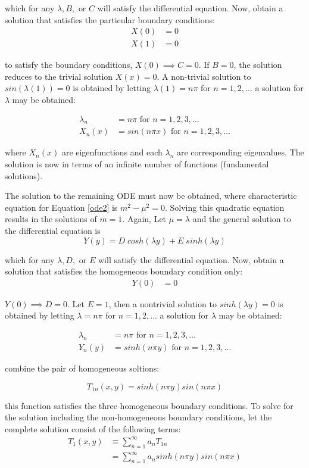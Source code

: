 \documentclass[letterpaper, 10pt, oneside]{article}
\newcommand{\as}[1]{\begin{align*}#1\end{align*}}
\newcommand{\an}[1]{\begin{align}#1\end{align}}
\begin{document}
	which  for any $\lambda, B, \text{ or } C$ will satisfy the differential equation. Now, obtain a solution that satisfies the particular boundary conditions:
	\as{X(0)&=0 \\ X(1)&=0}

	to satisfy the boundary conditions, $X(0) \implies C = 0$. If $B=0$, the solution reduces to the trivial solution $X(x)=0$. A non-trivial solution to $sin(\lambda (1))=0$ is obtained by letting $\lambda (1)=n\pi$ for $ n=1,2,...$ a solution for $\lambda$ may be obtained:
	
	\an{\lambda_n &= n\pi \text{ for } n = 1,2,3,\ldots \\
	X_n(x) &= sin\left( n\pi x \right) \text{ for } n = 1,2,3,\ldots }


	 where $X_n(x)$ are eigenfunctions and each $\lambda_n$ are corresponding eigenvalues.  The solution is now in terms of an infinite number of functions (fundamental solutions).  

	 The solution to the remaining ODE must now be obtained, where characteristic equation for Equation \ref{ode2} is $m^2 - \mu^2 = 0$.  Solving this quadratic equation results in the solutions of $m = 1$. Again, Let $\mu = \lambda$ and the general solution to the differential equation is 
	 $$Y(y) = D \; cosh(\lambda y) + E \; sinh(\lambda y)$$

	 which  for any $\lambda, D, \text{ or } E$ will satisfy the differential equation. Now, obtain a solution that satisfies the homogeneous boundary condition only:
	\as{Y(0)&=0}

	$Y(0) \implies D = 0$. Let $E=1$, then a nontrivial solution to $sinh(\lambda y)=0$ is obtained by letting $\lambda =n\pi$ for $ n=1,2,...$ a solution for $\lambda$ may be obtained:
	
	\an{\lambda_n &= n\pi \text{ for } n = 1,2,3,\ldots \\
	Y_n(y) &= sinh\left( n\pi y \right) \text{ for } n = 1,2,3,\ldots }

	combine the pair of homogeneous soltions:

	$$T_{1n}(x,y) = sinh\left( n\pi y \right) sin\left( n\pi x \right) $$

	this function satisfies the three homogeneous boundary conditions.  To solve for the solution including the non-homogeneous boundary conditions, let the complete solution consist of the following terms:
	\as{T_1(x,y) & \equiv \sum_{n=1}^\infty a_n T_{1n} \\
	 & = \sum_{n=1}^\infty a_n sinh\left( n\pi y \right) sin\left( n\pi x \right)}
\end{document}
